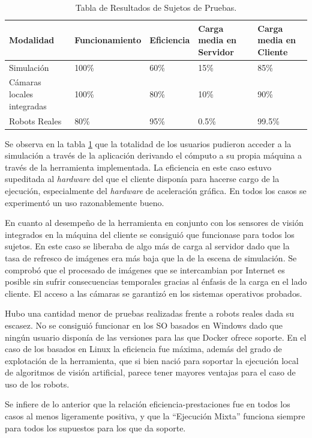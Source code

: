 \begin{table}[htbp]
\begin{center}
\begin{tabular}{| p{1.8cm}| p{2.6cm} | p{1.7cm}| p{2.4cm}| p{3cm}|}
\hline
Modalidad & Funcionamiento & Eficiencia & Carga media en Servidor & Carga media en Cliente \\
\hline \hline
Simulación & 100\% & 60\% & 15\% & 85\%\\ \hline
Cámaras locales integradas & 100\% & 80\% & 10\% & 90\%\\ \hline
Robots Reales & 80\% & 95\% & 0.5\% & 99.5\%\\ \hline
\end{tabular}
\caption{Tabla de Resultados de Sujetos de Pruebas.}
\label{tabla:res_pruebas}
\end{center}
\end{table}

Se observa en la tabla \ref{tabla:res_pruebas} que la totalidad de los usuarios pudieron acceder a la simulación a través de la aplicación derivando el cómputo a su propia máquina a través de la herramienta implementada. La eficiencia en este caso estuvo supeditada al \textit{hardware} del que el cliente disponía para hacerse cargo de la ejecución, especialmente del \textit{hardware} de aceleración gráfica. En todos los casos se experimentó un uso razonablemente bueno.

En cuanto al desempeño de la herramienta en conjunto con los sensores de visión integrados en la máquina del cliente se consiguió que funcionase para todos los sujetos. En este caso se liberaba de algo más de carga al servidor dado que la tasa de refresco de imágenes era más baja que la de la escena de simulación. Se comprobó que el procesado de imágenes que se intercambian por Internet es posible sin sufrir consecuencias temporales gracias al énfasis de la carga en el lado cliente. El acceso a las cámaras se garantizó en los sistemas operativos probados.

Hubo una cantidad menor de pruebas realizadas frente a robots reales dada su escasez. No se consiguió funcionar en los SO basados en Windows dado que ningún usuario disponía de las versiones para las que Docker ofrece soporte. En el caso de los basados en Linux la eficiencia fue máxima, además del grado de explotación de la herramienta, que si bien nació para soportar la ejecución local de algoritmos de visión artificial, parece tener mayores ventajas para el caso de uso de los robots. 

Se infiere de lo anterior que la relación eficiencia-prestaciones fue en todos los casos al menos ligeramente positiva, y que la ``Ejecución Mixta'' funciona siempre para todos los supuestos para los que da soporte.

